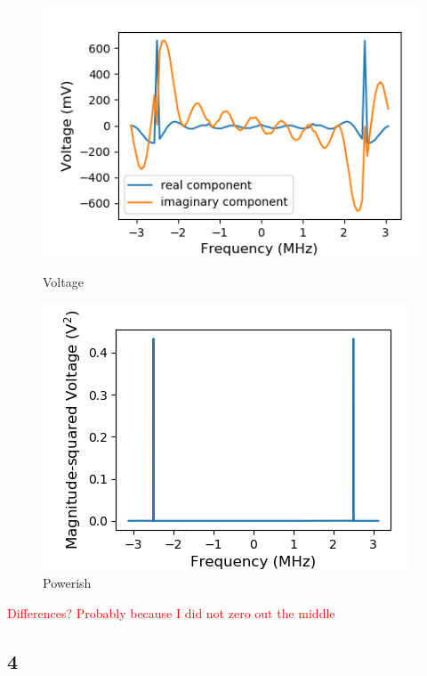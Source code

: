 \documentclass[a4paper]{article}
\begin{document}
\begin{figure}
\centering
\begin{minipage}{.5\textwidth}
	\centering
	\includegraphics[width=.8\linewidth]{5-3/volt3}
	\caption{Voltage}
	\label{fig:inverse}
\end{minipage}%
\begin{minipage}{.5\textwidth}
	\centering
	\includegraphics[width=.8\linewidth]{5-3/pow3}
	\caption{Powerish}
	\label{fig:ACF}
\end{minipage}
\end{figure}

\textcolor{red}{Differences? Probably because I did not zero out the middle}

\subsection{4}
\end{document}
